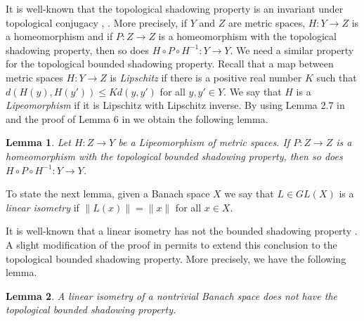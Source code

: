 \documentclass[11pt,letterpaper]{amsart}
\newtheorem{lem}{Lemma}
\numberwithin{equation}{section}
\begin{document}
It is well-known that the topological shadowing property is an invariant under topological conjugacy \cite{dlrw}, \cite{lny}.
More precisely, if $Y$ and $Z$ are metric spaces, $H:Y\to Z$ is a homeomorphism and if $P:Z\to Z$ is a homeomorphism with the topological shadowing property, then so does $H\circ P\circ H^{-1}:Y\to Y$.
We need a similar property for the topological bounded shadowing property.
Recall that a map between metric spaces $H:Y\to Z$ is {\em Lipschitz} if there is
a positive real number $K$ such that
$d(H(y),H(y'))\leq Kd(y,y')$ for all $y,y'\in Y$.
We say that $H$ is a {\em Lipeomorphism} if it is Lipschitz with Lipschitz inverse.
By using Lemma 2.7 in \cite{lny} and the proof of Lemma 6 in \cite{lm} we obtain the following lemma.

\begin{lem}
\label{horizon}
Let $H:Z\to Y$ be a Lipeomorphism of metric spaces.
If $P:Z\to Z$ is a homeomorphism with the topological bounded shadowing property, then so does $H\circ P\circ H^{-1}:Y\to Y$.
\end{lem}

To state the next lemma, given a Banach space $X$ we say that $L\in GL(X)$ is a {\em linear isometry}
if $\|L(x)\|=\|x\|$ for all $x\in X$.

It is well-known that a linear isometry has not the bounded shadowing property \cite{lm}.
A slight modification of the proof in \cite{lm} permits to extend
this conclusion to the topological bounded shadowing property. More precisely, we have the following lemma.

\begin{lem}
\label{l1}
A linear isometry of a nontrivial Banach space does not have the topological bounded shadowing property.
\end{lem}
\end{document}
